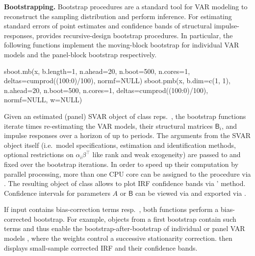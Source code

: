 \textbf{Bootstrapping.} Bootstrap procedures are a standard tool for VAR modeling to reconstruct the sampling distribution and perform inference. For estimating standard errors of point estimates and confidence bands of structural impulse-responses,  provides recursive-design bootstrap procedures. In particular, the following functions implement the moving-block bootstrap for individual VAR models \citep{BruggemannEtAl2016} and the panel-block bootstrap \citep{EmptingEtAl2024} respectively. 
\begin{CodeChunk}
\begin{CodeInput}
sboot.mb(x, b.length=1, n.ahead=20, n.boot=500, n.cores=1, 
	  deltas=cumprod((100:0)/100), normf=NULL)
sboot.pmb(x, b.dim=c(1, 1), n.ahead=20, n.boot=500, n.cores=1, 
	  deltas=cumprod((100:0)/100), normf=NULL, w=NULL)
\end{CodeInput}
\end{CodeChunk}
Given an estimated (panel) SVAR object  of class  reps.~, the bootstrap functions iterate  times re-estimating the VAR models, their structural matrices $ \mathsf{B}_i $, and impulse responses over a horizon of up to  periods. The arguments from the SVAR object itself (i.e.~model specifications, estimation and identification methods, optional restrictions on $ \alpha_i \beta^\top $ like rank and weak exogeneity) are passed to and fixed over the bootstrap iterations. In order to speed up their computation by parallel processing, more than one CPU core can be assigned to the procedure via . The resulting  object of class  allows to plot IRF confidence bands via '  method. Confidence intervals for parameters $ A $ or $ \mathsf{B} $ can be viewed via  and exported via .

If input  contains bias-correction terms  resp.~, both functions perform a bias-corrected bootstrap. For example, objects from a first bootstrap contain such terms and thus enable the bootstrap-after-bootstrap of individual \citep{Kilian1998} or panel VAR models \citep{EmptingEtAl2024}, where the weights  control a successive stationarity correction.  then displays small-sample corrected IRF and their confidence bands. 

